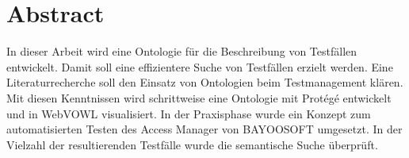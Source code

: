 \chapter*{Abstract}
In dieser Arbeit wird eine Ontologie für die Beschreibung von Testfällen entwickelt. Damit soll eine effizientere Suche von Testfällen erzielt werden. Eine Literaturrecherche soll den Einsatz von Ontologien beim Testmanagement klären. Mit diesen Kenntnissen wird schrittweise eine Ontologie mit Protégé entwickelt und in WebVOWL visualisiert. In der Praxisphase wurde ein Konzept zum automatisierten Testen des Access Manager von BAYOOSOFT umgesetzt. In der Vielzahl der resultierenden Testfälle wurde die semantische Suche überprüft. 
